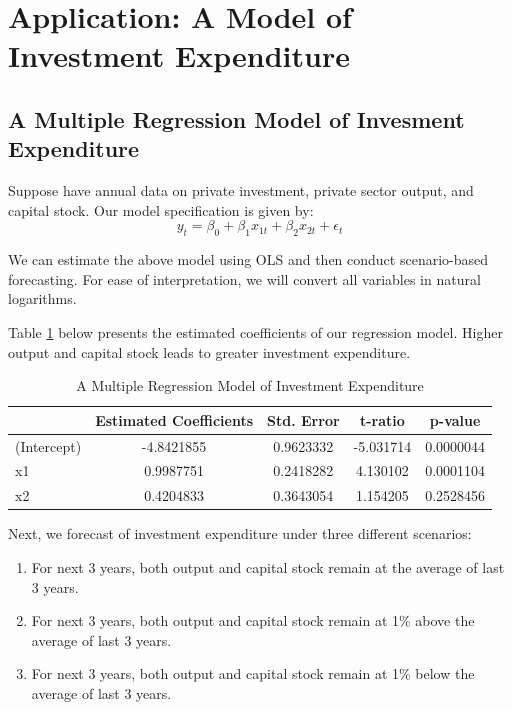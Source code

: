 \documentclass[]{book}
\theoremstyle{definition}
\theoremstyle{definition}
\theoremstyle{definition}
\theoremstyle{remark}
\begin{document}
\hypertarget{application-a-model-of-investment-expenditure}{%
\section{Application: A Model of Investment Expenditure}\label{application-a-model-of-investment-expenditure}}

\hypertarget{a-multiple-regression-model-of-invesment-expenditure}{%
\subsection{A Multiple Regression Model of Invesment Expenditure}\label{a-multiple-regression-model-of-invesment-expenditure}}

Suppose have annual data on private investment, private sector output, and capital stock. Our model specification is given by:
\begin{equation}
y_t= \beta_0 + \beta_1 x_{1t}+ \beta_2 x_{2t}+\epsilon_t
\end{equation}

We can estimate the above model using OLS and then conduct scenario-based forecasting. For ease of interpretation, we will convert all variables in natural logarithms.

Table \ref{tab:ch2-table1} below presents the estimated coefficients of our regression model. Higher output and capital stock leads to greater investment expenditure.

\begin{table}[t]

\caption{\label{tab:ch2-table1}A Multiple Regression Model of Investment Expenditure}
\centering
\begin{tabular}{lcccc}
\toprule
  & Estimated Coefficients & Std. Error & t-ratio & p-value\\
\midrule
(Intercept) & -4.8421855 & 0.9623332 & -5.031714 & 0.0000044\\
x1 & 0.9987751 & 0.2418282 & 4.130102 & 0.0001104\\
x2 & 0.4204833 & 0.3643054 & 1.154205 & 0.2528456\\
\bottomrule
\end{tabular}
\end{table}

Next, we forecast of investment expenditure under three different scenarios:

\begin{enumerate}
\def\labelenumi{\arabic{enumi}.}
\item
  For next 3 years, both output and capital stock remain at the average of last 3 years.
\item
  For next 3 years, both output and capital stock remain at 1\% above the average of last 3 years.
\item
  For next 3 years, both output and capital stock remain at 1\% below the average of last 3 years.
\end{enumerate}
\end{document}
